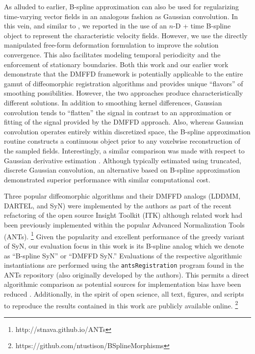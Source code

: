 \documentclass{frontiersSCNS}
\begin{document}
As alluded to earlier, B-spline approximation can also be used for
regularizing time-varying vector fields in an analogous fashion as
Gaussian convolution.  In this vein, and similar to
\cite{de-craene2011}, we reported in \cite{tustison2012a,tustison2012}
the use of an $n$-D + time B-spline object to represent the
characteristic velocity fields.  However, we use the directly
manipulated free-form deformation formulation to improve the solution
convergence.  This also facilitates modeling temporal periodicity and
the enforcement of stationary boundaries.  Both this work and our
earlier work \citep{tustison2009} demonstrate that the DMFFD framework
is potentially applicable to the entire gamut of diffeomorphic
registration algorithms and provides unique ``flavors'' of smoothing
possibilities.  However, the two approaches produce characteristically
different solutions.  In addition to smoothing kernel differences,
Gaussian convolution tends to ``flatten'' the signal in contrast to an
approximation or fitting of the signal provided by the DMFFD approach.
Also, whereas Gaussian convolution operates entirely within
discretized space, the B-spline approximation routine constructs a
continuous object prior to any voxelwise reconstruction of the sampled
fields.  Interestingly, a similar comparison was made with respect to
Gaussian derivative estimation \citep{bourma2007}.  Although typically
estimated using truncated, discrete Gaussian convolution, an
alternative based on B-spline approximation demonstrated superior
performance with similar computational cost.

Three popular diffeomorphic algorithms and their DMFFD
analogs (LDDMM, DARTEL, and SyN) were implemented by the authors as
part of the recent refactoring of the open source Insight Toolkit
(ITK) although related work had been previously implemented within the
popular Advanced Normalization Tools (ANTs).%
\footnote{
http://stnava.github.io/ANTs
}
Given the popularity and excellent performance of the greedy variant
of SyN, our evaluation focus in this work is its B-spline
analog which we denote as ``B-spline SyN'' or ``DMFFD SyN.''
Evaluations of the respective algorithmic
instantiations are performed using the \verb#antsRegistration# program
found in the ANTs repository (also originally developed by the
authors).  This permits a direct algorithmic comparison as potential
sources for implementation bias have been reduced
\citep{tustison2013}.  Additionally, in the spirit of open science,
all text, figures, and scripts to reproduce the results contained in
this work are publicly available online.%
\footnote{
https://github.com/ntustison/BSplineMorphisms
}
\end{document}
